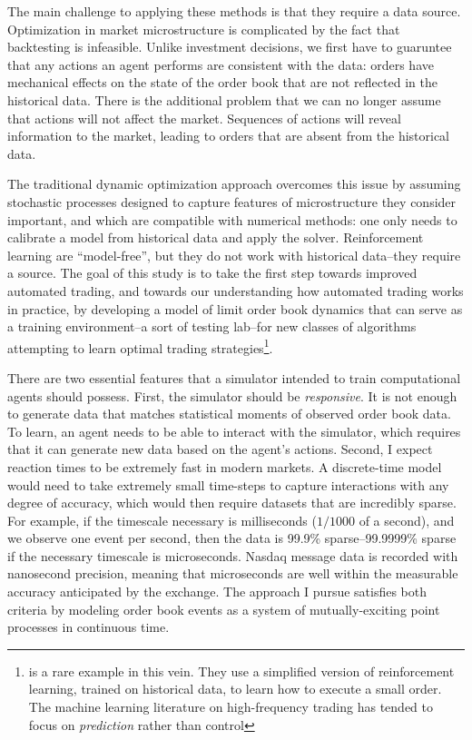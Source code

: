 	The main challenge to applying these methods is that they require a data source. Optimization in market microstructure is complicated by the fact that backtesting is infeasible. Unlike investment decisions, we first have to guaruntee that any actions an agent performs are consistent with the data: orders have mechanical effects on the state of the order book that are not reflected in the historical data. There is the additional problem that we can no longer assume that actions will not affect the market. Sequences of actions will reveal information to the market, leading to orders that are absent from the historical data.

	The traditional dynamic optimization approach overcomes this issue by assuming stochastic processes designed to capture features of microstructure they consider important, and which are compatible with numerical methods: one only needs to calibrate a model from historical data and apply the solver. Reinforcement learning are ``model-free'', but they do not work with historical data--they require a source. The goal of this study is to take the first step towards improved automated trading, and towards our understanding how automated trading works in practice, by developing a model of limit order book dynamics that can serve as a training environment--a sort of testing lab--for new classes of algorithms attempting to learn optimal trading strategies\footnote{\cite{Nevmyvaka2006} is a rare example in this vein. They use a simplified version of reinforcement learning, trained on historical data, to learn how to execute a small order. The machine learning literature on high-frequency trading has tended to focus on \textit{prediction} rather than control}.

	There are two essential features that a simulator intended to train computational agents should possess. First, the simulator should be \textit{responsive}. It is not enough to generate data that matches statistical moments of observed order book data. To learn, an agent needs to be able to interact with the simulator, which requires that it can generate new data based on the agent's actions. Second, I expect reaction times to be extremely fast in modern markets. A discrete-time model would need to take extremely small time-steps to capture interactions with any degree of accuracy, which would then require datasets that are incredibly sparse. For example, if the timescale necessary is milliseconds ($1/1000$ of a second), and we observe one event per second, then the data is 99.9\% sparse--99.9999\% sparse if the necessary timescale is microseconds. Nasdaq message data is recorded with nanosecond precision, meaning that microseconds are well within the measurable accuracy anticipated by the exchange. The approach I pursue satisfies both criteria by modeling order book events as a system of mutually-exciting point processes in continuous time.

